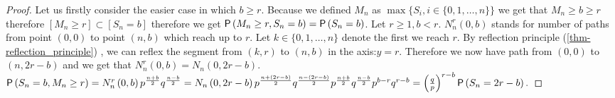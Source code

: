 \begin{proof}
 Let us firstly consider the easier case in which $b \geq r$. Because we defined $M_n$ as $\max \{S_i, i\in \{0, 1, \ldots, n \} \}$ we get that $M_n \geq b \geq r$
 therefore $[M_n \geq r] \subset [S_n=b]$ therefore we get $\operatorname{\textsf{P}} \left( M_n\geq r, S_n=b \right) =
 \operatorname{\textsf{P}} \left( S_n=b \right) $.
 Let $r\geq 1, b<r$. $N_n^r \left( 0,b \right) $ stands for number of paths from point $ \left( 0,0 \right) $ to point $ \left( n,b \right) $ which reach up to $r$.
 Let $k \in \{ 0, 1, \ldots, n \}$ denote the first \Time we reach $r$. By reflection principle (\ref{thm-reflection_principle}) , we can reflex the segment from $\left(k,r\right)$ to $ \left( n,b \right) $ in the axis:$y=r$.
 Therefore we now have path from $ \left( 0,0 \right) $ to $ \left( n,2r-b \right) $ and we get that $N_n^r \left( 0,b \right) =N_n \left( 0,2r-b \right) $. $\operatorname{\textsf{P}} \left( S_n=b,M_n\geq r \right) =N_n^r \left( 0,b \right) p^{\frac{n+b}{2}}q^{\frac{n-b}{2}}=
 N_n \left( 0,2r-b \right) p^{\frac{n+ \left( 2r-b \right) }{2}}q^{\frac{n- \left( 2r-b \right) }{2}}p^{\frac{n+b}{2}}q^{\frac{n-b}{2}}p^{b-r}q^{r-b}= \left( \frac{q}{p} \right) ^{r-b}\operatorname{\textsf{P}} \left( S_n=2r-b \right).$
\end{proof}

